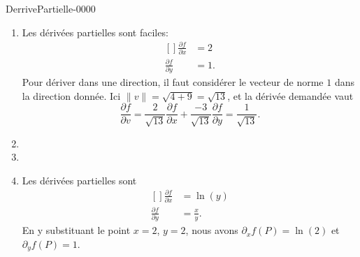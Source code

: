 
\begin{corrige}{DerrivePartielle-0000}

	\begin{enumerate}

		\item
			Les dérivées partielles sont faciles:
			\begin{equation}
				\begin{aligned}[]
					\frac{ \partial f }{ \partial x }&=2\\
					\frac{ \partial f }{ \partial y }&=1.
				\end{aligned}
			\end{equation}
			Pour dériver dans une direction, il faut considérer le vecteur de norme $1$ dans la direction donnée. Ici $\| v \|=\sqrt{4+9}=\sqrt{13}$, et la dérivée demandée vaut
			\begin{equation}
				\frac{ \partial f }{ \partial v }=\frac{ 2 }{ \sqrt{13} }\frac{ \partial f }{ \partial x }+\frac{ -3 }{ \sqrt{13} }\frac{ \partial f }{ \partial y }=\frac{1}{ \sqrt{13} }.
			\end{equation}
			
		\item
		\item
		\item
			Les dérivées partielles sont
			\begin{equation}
				\begin{aligned}[]
					\frac{ \partial f }{ \partial x }&=\ln(y)\\
					\frac{ \partial f }{ \partial y }&=\frac{ x }{ y }.
				\end{aligned}
			\end{equation}
			En y substituant le point $x=2$, $y=2$, nous avons $\partial_xf(P)=\ln(2)$ et $\partial_yf(P)=1$.


\end{enumerate}
\end{corrige}
